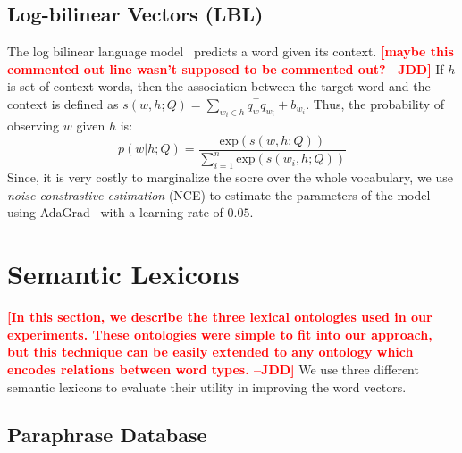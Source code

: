 \documentclass[11pt]{article}
\newcommand{\jdd}[1]{\textcolor{red}{\bf\small [#1 --JDD]}}
\begin{document}
\subsection{Log-bilinear Vectors (LBL)}
\label{sec:lbl}

The log bilinear language model~\cite{MnihTeh2012} predicts a word given its
context.  \jdd{maybe this commented out line wasn't supposed to be commented out?}
If $h$ is set of context words, then the association between the target word 
and the context is defined
as $s(w, h;Q) = \sum_{w_i \in h}q_{w}^{\top}q_{w_{i}} + b_{w_{i}}$. Thus, the probability of observing $w$ given $h$ is:
\begin{equation}
  \label{equ:prob-lbl}
  p(w|h;Q) = \frac{\text{exp}(s(w, h;Q))}{\sum_{i=1}^{n}\text{exp}(s(w_{i}, h;Q))}
\end{equation}
Since, it is very costly to marginalize the socre over the whole vocabulary, 
we use \textit{noise constrastive estimation} (NCE) to estimate the parameters 
of the model~\cite{MnihTeh2012} using AdaGrad~\cite{Duchi:EECS-2010-24} with a 
learning rate of $0.05$.

\section{Semantic Lexicons}
\label{sec:lexicons}

\jdd{In this section, we describe the three lexical ontologies used in our experiments. These ontologies were simple to fit into our approach, but this technique can be easily extended to any ontology which encodes relations between word types.} We use three different semantic lexicons to evaluate their utility in improving
the word vectors.

\subsection{Paraphrase Database} 
\label{sec:ppdb}
\end{document}

